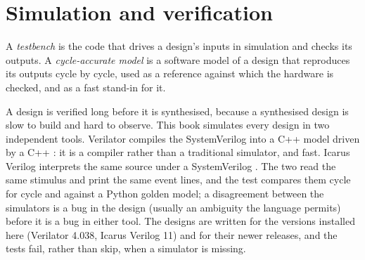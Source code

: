 \label{lst:nw:programmable-hardware-i-architecture-and-toolchain:cmp}

\section{Simulation and verification}

\begin{definition}\label{def:nw:programmable-hardware-i-architecture-and-toolchain:tb}
A \emph{testbench} is the code that drives a design's inputs in simulation and checks its outputs. A \emph{cycle-accurate
model} is a software model of a design that reproduces its outputs cycle by cycle, used as a reference against
which the hardware is checked, and as a fast stand-in for it.
\end{definition}

A design is verified long before it is synthesised, because a synthesised design is slow to build and hard to observe. This book
simulates every design in two independent tools. Verilator compiles the SystemVerilog into a C++ model driven by a C++ : it is
a compiler rather than a traditional simulator, and fast. Icarus Verilog interprets the same source under a SystemVerilog . The
two  read the same stimulus and print the same event lines, and the test compares them cycle for cycle and against a Python
golden model; a disagreement between the simulators is a bug in the design (usually an ambiguity the language permits) before it is a bug
in either tool. The designs are written for the versions installed here (Verilator 4.038, Icarus Verilog 11) and for their newer releases,
and the tests fail, rather than skip, when a simulator is missing.

